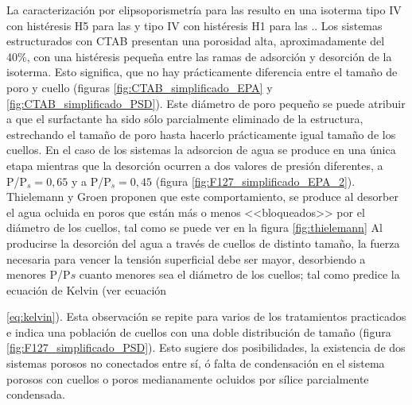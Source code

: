 			La caracterización por elipsoporismetría para las \pdmF\space resulto en una isoterma tipo IV con histéresis H5 para las \pdmC\space y tipo IV con histéresis H1 para las \pdmF.\cite{Thommes2015}. Los sistemas estructurados con CTAB presentan una porosidad alta, aproximadamente del 40\%, con una histéresis pequeña entre las ramas de adsorción y desorción de la isoterma. Esto significa, que no hay prácticamente diferencia entre el tamaño de poro y cuello (figuras \ref{fig:CTAB_simplificado_EPA}  y \ref{fig:CTAB_simplificado_PSD}). Este diámetro de poro pequeño se puede atribuir a que el surfactante ha sido sólo parcialmente eliminado de la estructura, estrechando el tamaño de poro hasta hacerlo prácticamente igual tamaño de los cuellos.
			En el caso de los sistemas \pdmF\space la adsorcion de agua se produce en una única etapa mientras que la desorción ocurren a dos valores de presión diferentes, a P/P$_s=0,65$ y a P/P$_s=0,45$ (figura \ref{fig:F127_simplificado_EPA_2}). Thielemann \cite{Thielemann2011} y Groen\cite{Groen2003} proponen que este comportamiento, se produce al desorber el agua ocluida en poros que están más o menos <<bloqueados>> por el diámetro de los cuellos, tal como se puede ver en la figura \ref{fig:thielemann} Al producirse la desorción del agua a través de cuellos de distinto tamaño, la fuerza  necesaria para vencer la tensión superficial debe ser mayor, desorbiendo a menores P/P$s$ cuanto menores sea el diámetro de los cuellos; tal como predice la ecuación de Kelvin (ver ecuación {\ref{eq:kelvin}). Esta observación se repite para varios de los tratamientos practicados e indica una población de cuellos con una doble distribución de tamaño (figura \ref{fig:F127_simplificado_PSD}). Esto sugiere dos posibilidades, la existencia de dos sistemas porosos no conectados entre sí, ó falta de condensación en el sistema porosos con cuellos o poros medianamente ocluidos por sílice parcialmente condensada.

}
